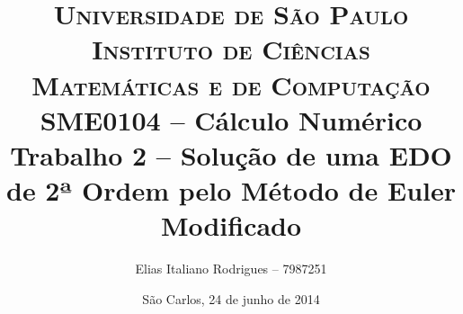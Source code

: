 \begin{titlepage}

		\title{
\textsc {\large Universidade de São Paulo\\
Instituto de Ciências Matemáticas e de Computação}\\[1cm]
{\large SME0104 -- Cálculo Numérico}\\[5cm]
{\LARGE Trabalho 2 -- Solução de uma EDO de 2ª Ordem pelo Método de Euler Modificado}\\[4cm]
		}

		\author{
Elias Italiano Rodrigues -- 7987251
		}

		\date{
\vfill São Carlos, 24 de junho de 2014
		}
	
		\maketitle
		\thispagestyle{empty}

\end{titlepage}
